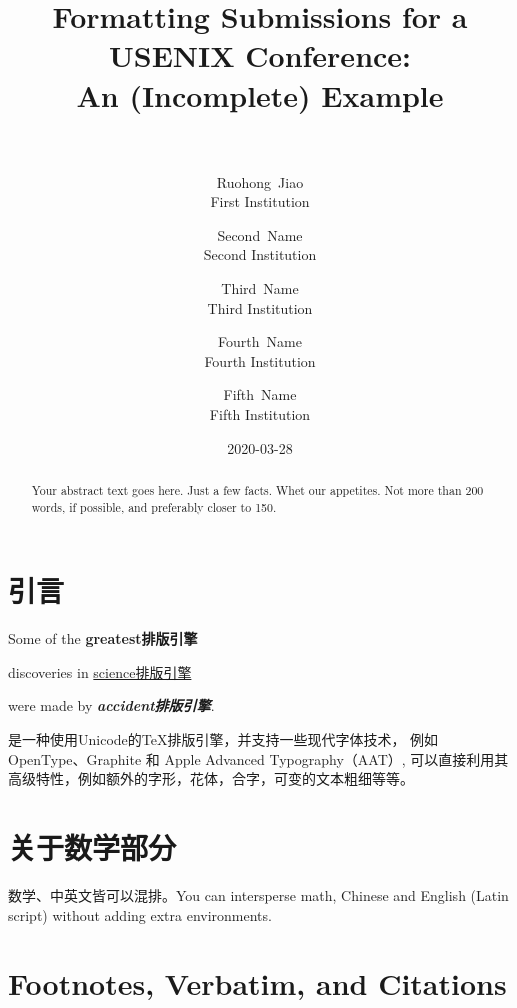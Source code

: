 \documentclass[a4paper,10pt,titlepage]{ctexart}
\title{\Large\bf Formatting Submissions for a USENIX Conference:\\
	An (Incomplete) Example\\
	\hologo{XeLaTeX}\\
}
\author{%
	{\rm Ruohong~Jiao}\\
	First Institution
	\and
	{\rm Second~Name}\\
	Second Institution
	\and
	{\rm Third~Name}\\
	Third Institution
	\and
	{\rm Fourth~Name}\\
	Fourth Institution
	\and
	{\rm Fifth~Name}\\
	Fifth Institution
}
\date{2020-03-28}
\begin{document}

\maketitle

\begin{abstract}
Your abstract text goes here. Just a few facts. Whet our appetites.
Not more than 200 words, if possible, and preferably closer to 150.
\end{abstract}


\section{引言}
Some of the \textbf{greatest排版引擎}\par
discoveries in \underline{science排版引擎}\par
were made by \textbf{\textit{accident排版引擎}}.\par

\XeTeX{}是一种使用Unicode的\TeX{}排版引擎，并支持一些现代字体技术，
例如 OpenType、Graphite 和 Apple Advanced Typography（AAT）, 可以直接利用其
高级特性，例如额外的字形，花体，合字，可变的文本粗细等等。\par

\lipsum[1]

\section{关于数学部分}
数学、中英文皆可以混排。You can intersperse math, Chinese and English 
(Latin script) without adding extra environments.

\section{Footnotes, Verbatim, and Citations}
\end{document}
